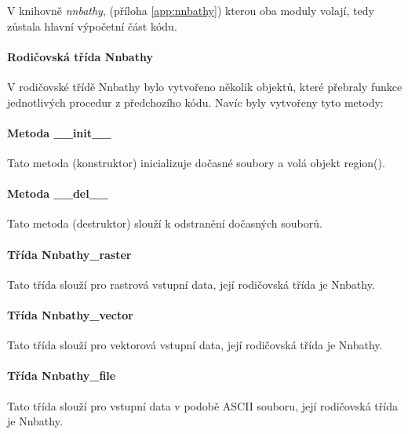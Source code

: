 \documentclass[12pt,a4paper]{article}
\begin{document}
V knihovně {\em nnbathy}, (příloha \ref{app:nnbathy}) kterou oba moduly volají, tedy zůstala hlavní
výpočetní část kódu.

\paragraph{Rodičovská třída Nnbathy} V rodičovské třídě Nnbathy bylo
vytvořeno několik objektů, které přebraly funkce jednotlivých procedur
z předchozího kódu. Navíc byly vytvořeny tyto metody:

\paragraph{Metoda \_\_init\_\_}
Tato metoda (konstruktor) inicializuje dočasné soubory a volá objekt region().

\paragraph{Metoda \_\_del\_\_}
Tato metoda (destruktor) slouží k odstranění dočasných souborů.

\paragraph{Třída Nnbathy\_raster}
Tato třída slouží pro rastrová vstupní data, její rodičovská třída je Nnbathy.

\paragraph{Třída Nnbathy\_vector}
Tato třída slouží pro vektorová vstupní data, její rodičovská třída je Nnbathy.

\paragraph{Třída Nnbathy\_file}
Tato třída slouží pro vstupní data v podobě ASCII souboru, její rodičovská třída je Nnbathy.
\end{document}
